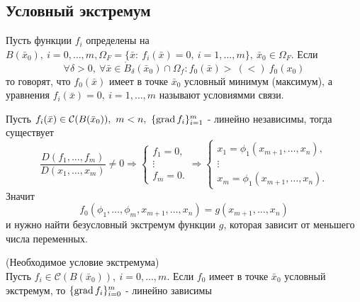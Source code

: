 \subsection{Условный экстремум}
\begin{definition}
Пусть функции $f_i$ определены на $B(\bar{x}_0),\ i=0,\dots, m, \Omega_F=\{\bar{x}:\ f_i(\bar{x})=0,\ i=1,\dots,m\},\ \bar{x}_0\in \Omega_F$. Если
\[\forall \delta>0,\ \forall \bar{x}\in \mathring{B}_{\delta}(\bar{x}_0)\cap \Omega_f: f_0(\bar{x}) >\ (<)\ f_0(x_0)\]
то говорят, что $f_0(\bar{x})$ имеет в точке $\bar{x}_0$ условный минимум (максимум), а уравнения $f_i(\bar{x})=0,\ i=1,\dots,m$ называют условиямми связи.
\end{definition} 
\begin{comm}
    Пусть $f_i(\bar{x})\in \mathcal{C}(B(\bar{x}_0)),\ m<n,\ \{\operatorname*{grad} f_i\}_{i=1}^m$ - линейно независимы, тогда существует
    \[\frac{D(f_1,\dots, f_m)}{D(x_1,\dots,x_m)}\ne 0 \Rightarrow \begin{cases}
        f_1=0,\\
        \vdots\\
        f_m=0.
    \end{cases}
    \Rightarrow \begin{cases} %
        x_1=\phi_1(x_{m+1},\dots,x_n),\\
        \vdots\\
        x_m=\phi_1(x_{m+1},\dots,x_n).
    \end{cases}
    \]
    Значит
    \[f_0(\phi_1,\dots,\phi_m,x_{m+1},\dots,x_n)=g(x_{m+1},\dots,x_n)\]
    и нужно найти безусловный экстремум функции $g$, которая зависит от меньшего числа переменных. 
\end{comm} 
\begin{theorem} (Необходимое условие экстремума)\\ %
    Пусть $f_i\in \mathcal{C}(B(\bar{x}_0)),\ i=0,\dots,m$. Если $f_0$ имеет в точке $\bar{x}_0$ условный экстремум, то $\{\operatorname*{grad} f_i\}_{i=0}^m$ - линейно зависимы
\end{theorem} 
